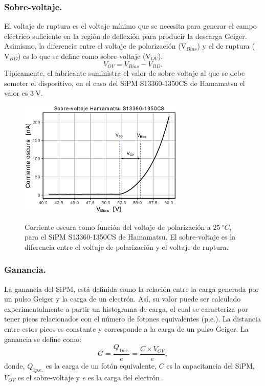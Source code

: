 \subsubsection{Sobre-voltaje.}
El voltaje de ruptura es el voltaje mínimo que se necesita para generar el campo eléctrico suficiente en la región de deflexión  para producir la descarga Geiger. Asimismo, la diferencia entre el voltaje de polarización ($\mbox{V}_{Bias}$) y el de ruptura ($\mbox{V}_{BD}$) es lo que se define como sobre-voltaje ($\mbox{V}_{OV}$).
\begin{equation}
V_{OV} = V_{Bias}-V_{BD}.
\label{Vbd_equation}    
\end{equation}
Típicamente, el fabricante suministra el valor de sobre-voltaje al que se debe someter el dispositivo, en el caso del SiPM S13360-1350CS de Hamamatsu el valor es $ 3~\mbox{V}$.
\begin{figure}[h!]
\begin{centering}
    \caption{Corriente oscura como función del voltaje de polarización a $25~^\circ C$, para el SiPM  S13360-1350CS de Hamamatsu. El sobre-voltaje es la diferencia entre el voltaje de polarización y el voltaje de ruptura.}
  \includegraphics[width=0.7\textwidth]{Images/overvoltaje.eps}
    \label{fig:Overvoltage}  
  \par\end{centering}
\end{figure}
\subsubsection{Ganancia.}
La ganancia del SiPM, está definida como la relación entre la carga generada por un pulso Geiger y la carga de un electrón. Así, su valor puede ser calculado experimentalmente a partir un histograma de carga, el cual se caracteriza por tener picos relacionados con el número de fotones equivalentes (p.e.). La distancia entre estos picos es constante  y corresponde a la carga de un pulso  Geiger. La ganancia se define como: %
\begin{equation}
    G=\frac{Q_{1p.e.}}{e} = \frac{C\times V_{OV}}{e},
    \label{Gain_eq}
\end{equation}
donde, $Q_{1p.e.}$ es la carga de un fotón equivalente, $C$ es la capacitancia del SiPM, $V_{OV}$ es el sobre-voltaje y \textit{e} es la carga del electrón \citep{Intro_SIPM_Sensl}.

